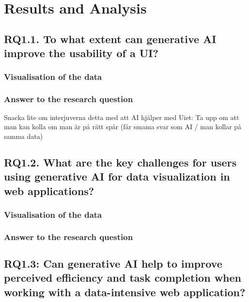 \chapter{Results and Analysis}
\label{chp:results}

\section{RQ1.1. To what extent can generative AI improve the usability of a UI?}
\subsection{Visualisation of the data}
\subsection{Answer to the research question}
Snacka lite om interjuverna detta med att AI hjälper med Uiet:
Ta upp om att man kan kolla om man är på rätt spår (får smama svar som AI / man kollar på samma data)

\section{RQ1.2. What are the key challenges for users using generative AI for data visualization in web applications?}
\subsection{Visualisation of the data}
\subsection{Answer to the research question}

\section{RQ1.3: Can generative AI help to improve perceived efficiency and task completion when working with a data-intensive web application?}
